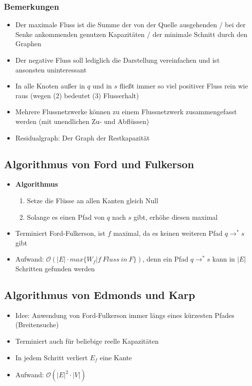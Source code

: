\subsubsection{Bemerkungen}
\begin{itemize}
	\item Der maximale Fluss ist die Summe der von der Quelle ausgehenden / bei der Senke ankommenden genutzen Kapazitäten / der minimale Schnitt durch den Graphen
	\item Der negative Fluss soll lediglich die Darstellung vereinfachen und ist ansonsten uninteressant
	\item In alle Knoten außer in \(q\) und in \(s\) fließt immer so viel positiver Fluss rein wie raus (wegen (2) bedeutet (3) Flusserhalt)
	\item Mehrere Flussnetzwerke können zu einem Flussnetzwerk zusammengefasst werden (mit unendlichen Zu- und Abflüssen)
	\item Residualgraph: Der Graph der Restkapazität
\end{itemize}


\subsection{Algorithmus von Ford und Fulkerson}
\begin{itemize}
	\item \textbf{Algorithmus}
	\begin{enumerate}
		\item Setze die Flüsse an allen Kanten gleich Null
		\item Solange es einen Pfad von \(q\) nach \(s\) gibt, erhöhe diesen maximal
	\end{enumerate}
	\item Terminiert Ford-Fulkerson, ist \(f\) maximal, da es keinen weiteren Pfad \(q \rightarrow^{*} s\) gibt
	\item Aufwand: \(\mathcal{O}(|E| \cdot max\{W_f | f~Fluss~in~F\})\), denn ein Pfad \(q \rightarrow^{*} s\) kann in \(|E|\) Schritten gefunden werden
\end{itemize}



\subsection{Algorithmus von Edmonds und Karp}
\begin{itemize}
	\item Idee: Anwendung von Ford-Fulkerson immer längs eines kürzesten Pfades (Breitensuche)
	\item Terminiert auch für beliebige reelle Kapazitäten
	\item In jedem Schritt verliert \(E_f\) eine Kante
	\item Aufwand: \(\mathcal{O} (|E|^2 \cdot |V|)\)
\end{itemize}


